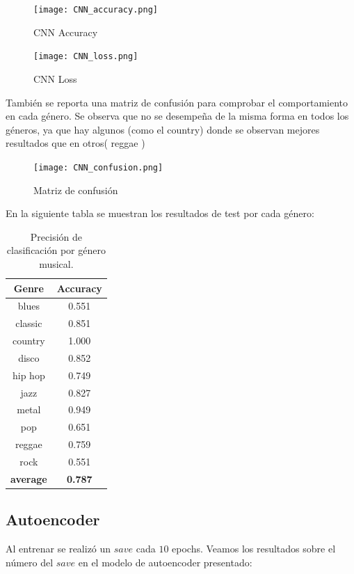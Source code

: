 \documentclass[colorinlistoftodos,twoside,twocolumn,10pt]{article} %
\begin{document}
\begin{figure}[h!] %
	\centering
	\texttt{[image: CNN\_accuracy.png]}
	\caption{CNN Accuracy}
\end{figure}

\begin{figure}[h!] %
	\centering
	\texttt{[image: CNN\_loss.png]}
	\caption{CNN Loss}
\end{figure}

Tambi\'en se reporta una matriz de confusi\'on para comprobar
el comportamiento en cada g\'enero. Se observa que no
se desempe\~na de la misma forma en todos los g\'eneros,
ya que hay algunos (como el country) donde se
observan mejores resultados que en otros( reggae )
\begin{figure}[h!] %
	\centering
	\texttt{[image: CNN\_confusion.png]}
	\caption{Matriz de confusi\'on}
\end{figure}

En la siguiente tabla se muestran los resultados de test por cada g\'enero:
\begin{table}[h]
\centering
\begin{tabular}{|c|c|}
\hline
\textbf{Genre} & \textbf{Accuracy} \\ \hline
blues & 0.551 \\ \hline
classic & 0.851 \\ \hline
country & 1.000 \\ \hline
disco & 0.852 \\ \hline
hip hop & 0.749 \\ \hline
jazz & 0.827 \\ \hline
metal & 0.949 \\ \hline
pop & 0.651 \\ \hline
reggae & 0.759 \\ \hline
rock & 0.551 \\ \hline
\textbf{average} & \textbf{0.787} \\ \hline
\end{tabular}
\caption{Precisi\'on de clasificaci\'on por g\'enero musical.}
\label{tabla:1}
\end{table}

\subsection{Autoencoder}
Al entrenar se realiz\'o un $save$ cada $10$ epochs. Veamos los resultados sobre el n\'umero del $save$ en el modelo de autoencoder presentado:
\end{document}
